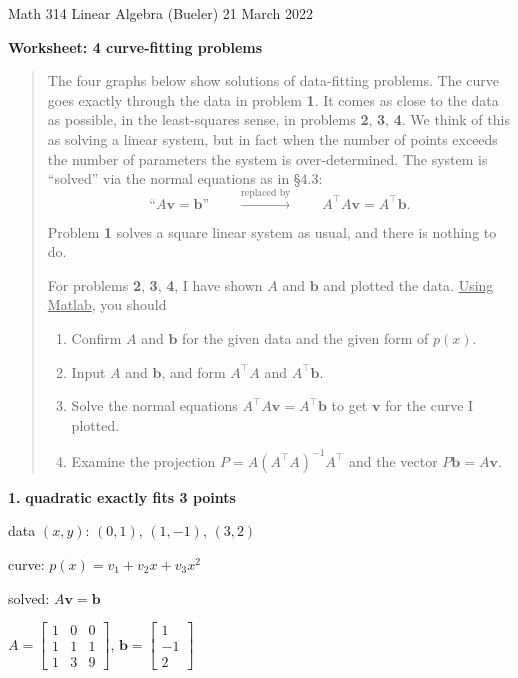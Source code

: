 \documentclass[12pt]{amsart}
\newcommand{\bb}{\mathbf{b}}
\newcommand{\bv}{\mathbf{v}}
\newcommand{\prob}[1]{\bigskip\noindent\textbf{#1.}\quad }
\newcommand{\ds}{\displaystyle}
\begin{document}
\scriptsize \noindent Math 314 Linear Algebra (Bueler) \hfill 21 March 2022 
\normalsize\medskip

\Large\centerline{\textbf{Worksheet: 4 curve-fitting problems}}
\medskip
\normalsize

\thispagestyle{empty}
\begin{quote}
\quad The four graphs below show solutions of data-fitting problems.  The curve goes exactly through the data in problem \textbf{1}.  It comes as close to the data as possible, in the least-squares sense, in problems \textbf{2}, \textbf{3}, \textbf{4}.  We think of this as solving a linear system, but in fact when the number of points exceeds the number of parameters the system is over-determined.  The system is ``solved'' via the normal equations as in \S4.3:
  $$\text{``}A\bv=\bb\text{''} \qquad \stackrel{\text{replaced by}}{\to} \qquad A^\top A \bv = A^\top \bb.$$

Problem \textbf{1} solves a square linear system as usual, and there is nothing to do.  

For problems \textbf{2}, \textbf{3}, \textbf{4}, I have shown $A$ and $\bb$ and plotted the data.  \underline{Using Matlab},  you should
\renewcommand{\labelenumi}{\emph{\roman{enumi})}}
\begin{enumerate}
\item Confirm $A$ and $\bb$ for the given data and the given form of $p(x)$.
\item Input $A$ and $\bb$, and form $A^\top A$ and $A^\top \bb$.
\item Solve the normal equations $A^\top A \bv = A^\top \bb$ to get $\bv$ for the curve I plotted.
\item Examine the projection $P = A(A^\top A)^{-1} A^\top$ and the vector $P\bb=A\bv$.
\end{enumerate}
\end{quote}

\newcommand{\msni}{\medskip\noindent}

\vspace{5mm}

\prob{1} \textbf{quadratic exactly fits 3 points}

\msni data $(x,y)$: $(0,1)$, $(1,-1)$, $(3,2)$

\msni curve: $p(x) = v_1 + v_2 x + v_3 x^2$

\msni solved: $A\bv=\bb$

\msni $\ds A = \begin{bmatrix} 1 & 0 & 0 \\ 1 & 1 & 1 \\ 1 & 3 & 9 \end{bmatrix}$, \quad $\ds \bb = \begin{bmatrix} 1 \\ -1 \\ 2 \end{bmatrix}$
\end{document}
